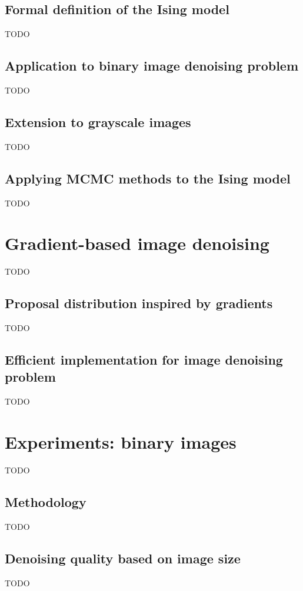 \documentclass[a4paper, 11pt, onecolumn, openany, titlepage]{report}
\newcommand\numberedchapter[1]{\setlength\topskip{3cm}\chapter{#1}\setlength\topskip{0cm}}
\begin{document}
\section{Formal definition of the Ising model}

TODO

\section{Application to binary image denoising problem}

TODO

\section{Extension to grayscale images}

TODO

\section{Applying MCMC methods to the Ising model}

TODO

\numberedchapter{Gradient-based image denoising}

TODO

\section{Proposal distribution inspired by gradients}

TODO

\section{Efficient implementation for image denoising problem}

TODO

\numberedchapter{Experiments: binary images}

TODO

\section{Methodology}

TODO

\section{Denoising quality based on image size}

TODO
\end{document}
